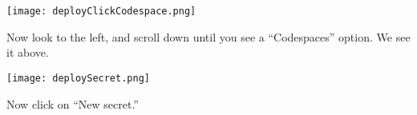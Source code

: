 \documentclass{ximera}
\begin{document}
        \pdfOnly{\end{multicols*}}

\pdfOnly{\newpage}

\begin{image}
    \texttt{[image: deployClickCodespace.png]}
\end{image}

Now look to the left, and scroll down until you see a ``Codespaces'' option.
We see it above.

\newpage

\begin{image}
    \texttt{[image: deploySecret.png]}
\end{image}

Now click on ``New secret.''

\newpage
\end{document}
